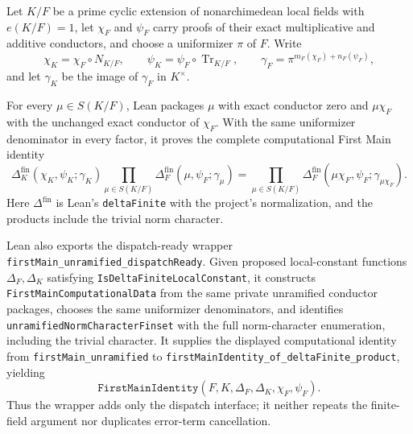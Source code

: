 \begin{theorem}\label{mod:cases-unramified}
Let $K/F$ be a prime cyclic extension of nonarchimedean local fields with
$e(K/F)=1$, let $\chi_F$ and $\psi_F$ carry proofs of their exact
multiplicative and additive conductors, and choose a uniformizer $\pi$ of
$F$.  Write
\[
 \chi_K=\chi_F\circ N_{K/F},\qquad
 \psi_K=\psi_F\circ\operatorname{Tr}_{K/F},\qquad
 \gamma_F=\pi^{m_F(\chi_F)+n_F(\psi_F)},
\]
and let $\gamma_K$ be the image of $\gamma_F$ in $K^\times$.

For every $\mu\in S(K/F)$, Lean packages $\mu$ with exact conductor zero
and $\mu\chi_F$ with the unchanged exact conductor of $\chi_F$.  With the
same uniformizer denominator in every factor, it proves the complete
computational First Main identity
\[
 \Delta_K^{\mathrm{fin}}(\chi_K,\psi_K;\gamma_K)
 \prod_{\mu\in S(K/F)}
   \Delta_F^{\mathrm{fin}}(\mu,\psi_F;\gamma_\mu)
 =
 \prod_{\mu\in S(K/F)}
   \Delta_F^{\mathrm{fin}}(\mu\chi_F,\psi_F;\gamma_{\mu\chi_F}).
\]
Here $\Delta^{\mathrm{fin}}$ is Lean's \texttt{deltaFinite} with the
project's normalization, and the products include the trivial norm
character.

Lean also exports the dispatch-ready wrapper
\texttt{firstMain\_unramified\_dispatchReady}.  Given proposed local-constant
functions $\Delta_F,\Delta_K$ satisfying
\texttt{IsDeltaFiniteLocalConstant}, it constructs
\texttt{FirstMainComputationalData} from the same private unramified
conductor packages, chooses the same uniformizer denominators, and identifies
\texttt{unramifiedNormCharacterFinset} with the full norm-character
enumeration, including the trivial character.  It supplies the displayed
computational identity from \texttt{firstMain\_unramified} to
\texttt{firstMainIdentity\_of\_deltaFinite\_product}, yielding
\[
 \texttt{FirstMainIdentity}(F,K,\Delta_F,\Delta_K,
   \chi_F,\psi_F).
\]
Thus the wrapper adds only the dispatch interface; it neither repeats the
finite-field argument nor duplicates error-term cancellation.


\end{theorem}

